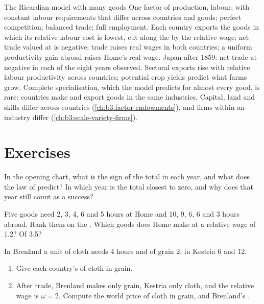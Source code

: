 \begin{model}{The Ricardian model with many goods}
\assumes One factor of production, labour, with constant labour requirements that
differ across countries and goods; perfect competition; balanced trade; full
employment.
\predicts Each country exports the goods in which its relative labour cost is
lowest, cut along the  by the relative wage; net
trade valued at  is negative; trade raises real wages in both
countries; a uniform productivity gain abroad raises Home's real wage.
\tested Japan after 1859: net trade at  negative in each of the
eight years observed. Sectoral exports rise with relative labour productivity
across countries; potential crop yields predict what farms grow.
\breaks Complete specialisation, which the model predicts for almost every good,
is rare: countries make and export goods in the same industries. Capital, land
and skills differ across countries (\cref{ch:b3:factor-endowments}), and firms
within an industry differ (\cref{ch:b3:scale-variety-firms}).
\end{model}

\section{Exercises}\label{sec:b3:ricardian-trade:exercises}

\begin{exercise}[$\star$]\label{exo:b3:ricardian-trade:1}
In the opening chart, what is the sign of the total in each year, and what does
the law of  predict? In which year is the total closest to
zero, and why does that year still count as a success?
\end{exercise}

\begin{exercise}[$\star$]\label{exo:b3:ricardian-trade:2}
Five goods need 2, 3, 4, 6 and 5 hours at Home and 10, 9, 6, 6 and 3 hours abroad.
Rank them on the . Which goods does Home make at a
relative wage of 1.2? Of 3.5?
\end{exercise}

\begin{exercise}[$\star$]\label{exo:b3:ricardian-trade:3}
In Brenland a unit of cloth needs 4 hours and of grain 2; in Kestria 6 and 12.
\begin{enumerate}
\item Give each country's  of cloth in grain.
\item After trade, Brenland makes only grain, Kestria only cloth, and the relative
wage is $\omega = 2$. Compute the world price of cloth in grain, and Brenland's
.
\end{enumerate}
\end{exercise}

